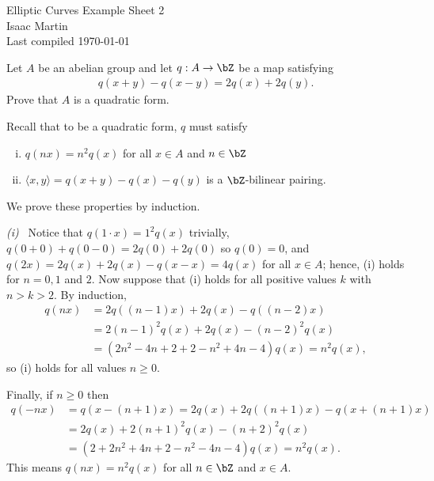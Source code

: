 


\pagestyle{empty}
	\LARGE
\begin{center}
	Elliptic Curves Example Sheet 2\\
	\Large
	Isaac Martin \\
    Last compiled \today
\end{center}
\normalsize
\vspace{-2mm}
\hru

\begin{homework}[e]
	\prob
	\prob Let $A$ be an abelian group and let $q:A\to \bZ$ be a map satisfying
	\begin{align*}
		q(x+y)-q(x-y) = 2q(x)+2q(y).
	\end{align*}
	Prove that $A$ is a quadratic form.
	\begin{prf}
		Recall that to be a quadratic form, $q$ must satisfy
		\begin{enumerate}[(i)]
			\item $q(nx) = n^2q(x)$ for all $x \in A$ and $n \in \bZ$ 
			\item $\langle x,y\rangle = q(x+y)-q(x)-q(y)$ is a $\bZ$-bilinear pairing.
		\end{enumerate}
        We prove these properties by induction.
		
		\bigskip

        \noindent \emph{(i)}~ Notice that $q(1\cdot x) = 1^2q(x)$ trivially, $q(0+0) + q(0-0) = 2q(0)+2q(0)$ so $q(0) = 0$, and $q(2x) = 2q(x) + 2q(x) - q(x - x) = 4q(x)$ for all $x\in A$; hence, (i) holds for $n = 0,1$ and $2$. Now suppose that (i) holds for all positive values $k$ with $n > k > 2$. By induction,
		\begin{align*}
			q(nx) &= 2q((n-1)x) + 2q(x) - q((n-2)x) \\
				  &= 2(n-1)^2q(x) + 2q(x) - (n-2)^2q(x) \\
				  &= (2n^2 - 4n + 2 + 2 - n^2 + 4n - 4)q(x) = n^2q(x),
		\end{align*}
		so (i) holds for all values $n \geq 0$. 

		Finally, if $n \geq 0$ then
		\begin{align*}
			q(-nx) &= q(x - (n+1)x) = 2q(x)+2q((n+1)x) - q(x+(n+1)x) \\
				   &= 2q(x) + 2(n+1)^2q(x) - (n+2)^2q(x) \\
				   &= (2 + 2n^2+4n+2 - n^2 - 4n - 4)q(x) = n^2 q(x).
		\end{align*}
		This means $q(nx) = n^2q(x)$ for all $n \in \bZ$ and $x \in A$.
		

\end{prf}
\end{homework}
